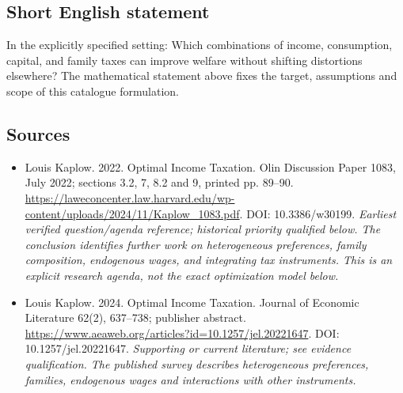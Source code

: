 \documentclass[11pt]{article}
\begin{document}
\subsection{Short English statement}
In the explicitly specified setting: Which combinations of income, consumption, capital, and family taxes can improve welfare without shifting distortions elsewhere? The mathematical statement above fixes the target, assumptions and scope of this catalogue formulation.

\subsection{Sources}
\begin{itemize}\raggedright
\item[\textnormal{[S1]}]\hypertarget{source:30007753:1}{} Louis Kaplow. 2022. Optimal Income Taxation. Olin Discussion Paper 1083, July 2022; sections 3.2, 7, 8.2 and 9, printed pp. 89–90.
\url{https://laweconcenter.law.harvard.edu/wp-content/uploads/2024/11/Kaplow_1083.pdf}.
DOI: 10.3386/w30199.
{\small\textit{Earliest verified question/agenda reference; historical priority qualified below. The conclusion identifies further work on heterogeneous preferences, family composition, endogenous wages, and integrating tax instruments. This is an explicit research agenda, not the exact optimization model below.}}

\item[\textnormal{[S2]}]\hypertarget{source:30007753:2}{} Louis Kaplow. 2024. Optimal Income Taxation. Journal of Economic Literature 62(2), 637–738; publisher abstract.
\url{https://www.aeaweb.org/articles?id=10.1257/jel.20221647}.
DOI: 10.1257/jel.20221647.
{\small\textit{Supporting or current literature; see evidence qualification. The published survey describes heterogeneous preferences, families, endogenous wages and interactions with other instruments.}}
\end{itemize}
\end{document}
